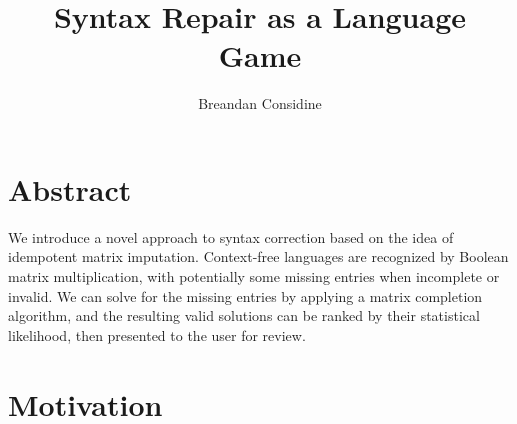 \documentclass[sigplan,screen]{acmart}
\begin{document}
\title{Syntax Repair as a Language Game}

\author{Breandan Considine}

%


\renewcommand{\shortauthors}{Considine et al.}


\maketitle

\section{Abstract}

We introduce a novel approach to syntax correction based on the idea of idempotent matrix imputation. Context-free languages are recognized by Boolean matrix multiplication, with potentially some missing entries when incomplete or invalid. We can solve for the missing entries by applying a matrix completion algorithm, and the resulting valid solutions can be ranked by their statistical likelihood, then presented to the user for review.

\section{Motivation}

\end{document}
